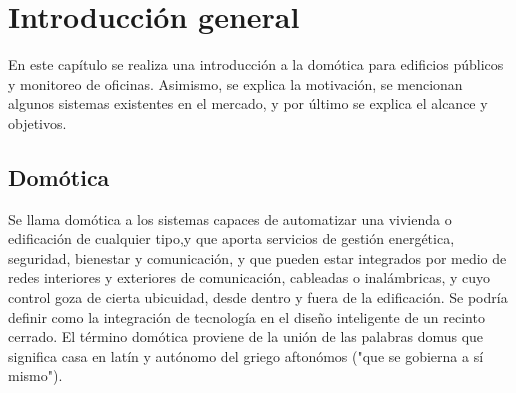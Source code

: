 
\chapter{Introducción general} %

\label{Chapter1} %
\label{IntroGeneral}

En este capítulo se realiza una introducción a la domótica para edificios públicos y monitoreo de oficinas. Asimismo, se explica la motivación, se mencionan algunos sistemas existentes en el mercado, y por último se explica el alcance y objetivos.

\newcommand{\keyword}[1]{\textbf{#1}}
\newcommand{\tabhead}[1]{\textbf{#1}}
\newcommand{\code}[1]{\texttt{#1}}
\newcommand{\file}[1]{\texttt{\bfseries#1}}
\newcommand{\option}[1]{\texttt{\itshape#1}}
\newcommand{\grados}{$^{\circ}$}




\section{Domótica}

Se llama domótica a los sistemas capaces de automatizar una vivienda o edificación de cualquier tipo,y que aporta servicios de gestión energética, seguridad, bienestar y comunicación, y que pueden estar integrados por medio de redes interiores y exteriores de comunicación, cableadas o inalámbricas, y cuyo control goza de cierta ubicuidad, desde dentro y fuera de la edificación. Se podría definir como la integración de tecnología en el diseño inteligente de un recinto cerrado.
El término domótica proviene de la unión de las palabras domus que significa casa en latín y autónomo del griego aftonómos ("que se gobierna a sí mismo").

